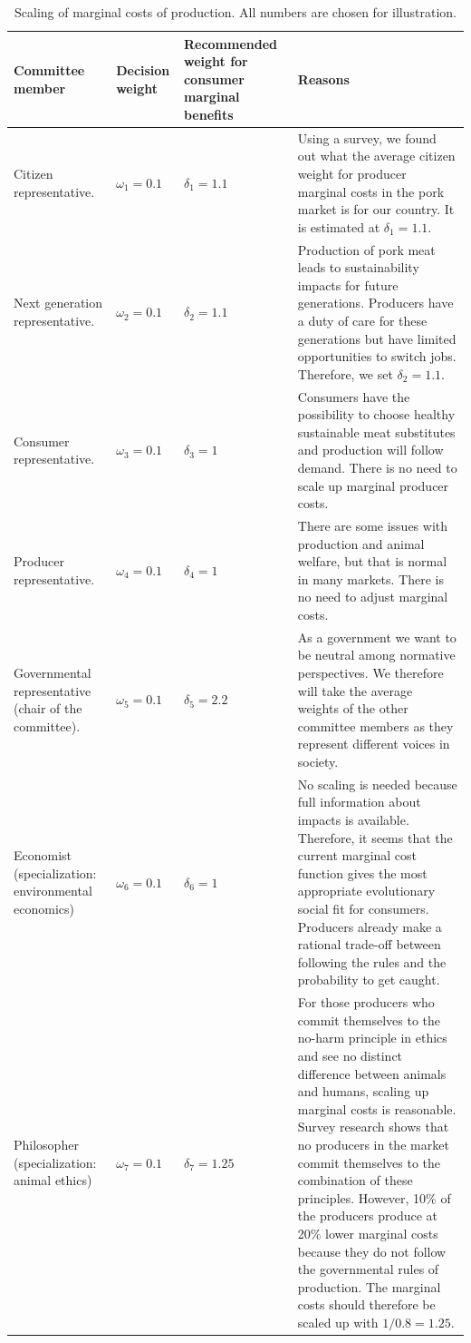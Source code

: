 \documentclass[
]{book}
\begin{document}
\begin{table}

\caption{\label{tab:scalingmarginal}Scaling of marginal costs of production. All numbers are chosen for illustration.}
\centering
\begin{tabular}[t]{llll}
\toprule
Committee member & Decision weight & Recommended weight for consumer marginal benefits & Reasons\\
\midrule
Citizen representative. & $\omega_1 = 0.1$ & $\delta_1 = 1.1$ & Using a survey, we found out what the average citizen weight for producer marginal costs in the pork market is for our country. It is estimated at $\delta_1=1.1$.\\
Next generation representative. & $\omega_2 = 0.1$ & $\delta_2 = 1.1$ & Production of pork meat leads to sustainability impacts for future generations. Producers have a duty of care for these generations but have limited opportunities to switch jobs. Therefore, we set $\delta_2=1.1$.\\
Consumer representative. & $\omega_3 = 0.1$ & $\delta_3 = 1$ & Consumers have the possibility to choose healthy sustainable meat substitutes and production will follow demand. There is no need to scale up marginal producer costs.\\
Producer representative. & $\omega_4 = 0.1$ & $\delta_4 = 1$ & There are some issues with production and animal welfare, but that is normal in many markets. There is no need to adjust marginal costs.\\
Governmental representative (chair of the committee). & $\omega_5 = 0.1$ & $\delta_5 = 2.2$ & As a government we want to be neutral among normative perspectives. We therefore will take the average weights of the other committee members as they represent different voices in society.\\
\addlinespace
Economist (specialization: environmental economics) & $\omega_6 = 0.1$ & $\delta_6 = 1$ & No scaling is needed because full information about impacts is available. Therefore, it seems that the current marginal cost function gives the most appropriate evolutionary social fit for consumers. Producers already make a rational trade-off between following the rules and the probability to get caught.\\
Philosopher (specialization: animal ethics) & $\omega_7 = 0.1$ & $\delta_7 = 1.25$ & For those producers who commit themselves to the no-harm principle in ethics and see no distinct difference between animals and humans, scaling up marginal costs is reasonable. Survey research shows that no producers in the market commit themselves to the combination of these principles. However, 10\% of the producers produce at 20\% lower marginal costs because they do not follow the governmental rules of production. The marginal costs should therefore be scaled up with $1/0.8=1.25$.\\

\end{tabular}
\end{table}
\end{document}
